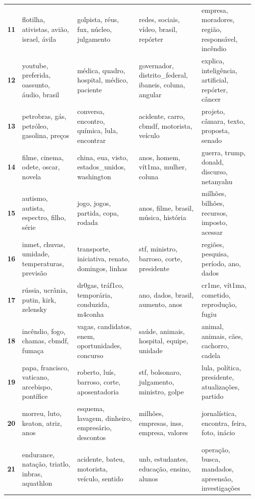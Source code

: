 \begin{xltabular}{\textwidth}{@{}l >{\RaggedRight\arraybackslash}X >{\RaggedRight\arraybackslash}X >{\RaggedRight\arraybackslash}X >{\RaggedRight\arraybackslash}X@{}}
    \textbf{11} & flotilha, ativistas, avião, israel, ávila & golpista, réus, fux, núcleo, julgamento & redes, sociais, vídeo, brasil, repórter & empresa, moradores, região, responsável, incêndio \\
    \textbf{12} & youtube, preferida, oassunto, áudio, brasil & médica, quadro, hospital, médico, paciente & governador, distrito\_federal, ibaneis, coluna, angular & explica, inteligência, artificial, repórter, câncer \\
    \textbf{13} & petrobras, gás, petróleo, gasolina, preços & conversa, encontro, química, lula, encontrar & acidente, carro, cbmdf, motorista, veículo & projeto, câmara, texto, proposta, senado \\
    \textbf{14} & filme, cinema, odete, oscar, novela & china, eua, visto, estados\_unidos, washington & anos, homem, vít1ma, mulher, coluna & guerra, trump, donald, discurso, netanyahu \\
    \textbf{15} & autismo, autista, espectro, filho, série & jogo, jogos, partida, copa, rodada & anos, filme, brasil, música, história & milhões, bilhões, recursos, imposto, acessar \\
    \textbf{16} & inmet, chuvas, umidade, temperaturas, previsão & transporte, iniciativa, renato, domingos, linhas & stf, ministro, barroso, corte, presidente & regiões, pesquisa, período, ano, dados \\
    \textbf{17} & rússia, ucrânia, putin, kirk, zelensky & dr0gas, tráf1co, temporária, conduzida, m4conha & ano, dados, brasil, aumento, anos & cr1me, vít1ma, cometido, reprodução, fugiu \\
    \textbf{18} & incêndio, fogo, chamas, cbmdf, fumaça & vagas, candidatos, enem, oportunidades, concurso & saúde, animais, hospital, equipe, unidade & animal, animais, cães, cachorro, cadela \\
    \textbf{19} & papa, francisco, vaticano, arcebispo, pontífice & roberto, luís, barroso, corte, aposentadoria & stf, bolsonaro, julgamento, ministro, golpe & lula, política, presidente, atualizações, partido \\
    \textbf{20} & morreu, luto, keaton, atriz, anos & esquema, lavagem, dinheiro, empresário, descontos & milhões, empresas, inss, empresa, valores & jornalística, encontra, feira, foto, inácio \\
    \textbf{21} & endurance, natação, triatlo, inbras, aquathlon & acidente, bateu, motorista, veículo, sentido & unb, estudantes, educação, ensino, alunos & operação, busca, mandados, apreensão, investigações \\

\end{xltabular}
